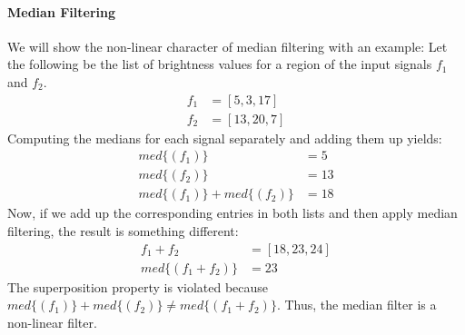 \documentclass[a4paper,twocolumn]{article}
\begin{document}
	\paragraph{Median Filtering} We will show the non-linear character of median filtering with an example: Let the following be the list of brightness values for a region of the input signals $f_1$ and $f_2$.
	\begin{align*}
	f_1 &= [5, 3, 17] \\
	f_2 &= [13, 20, 7]
	\end{align*}
	Computing the medians for each signal separately and adding them up yields:
	\begin{align*}
	med\{(f_1)\} &= 5 \\
	med\{(f_2)\} &= 13 \\
	med\{(f_1)\} + med\{(f_2)\} &= 18
	\end{align*}
	Now, if we add up the corresponding entries in both lists and then apply median filtering, the result is something different:
	\begin{align*}
	f_1 + f_2 &= [18, 23, 24] \\
	med\{(f_1 + f_2)\} &= 23
	\end{align*}
	The superposition property is violated because $med\{(f_1)\} + med\{(f_2)\} \neq med\{(f_1 + f_2)\}$. Thus, the median filter is a non-linear filter.
	

	
\end{document}
